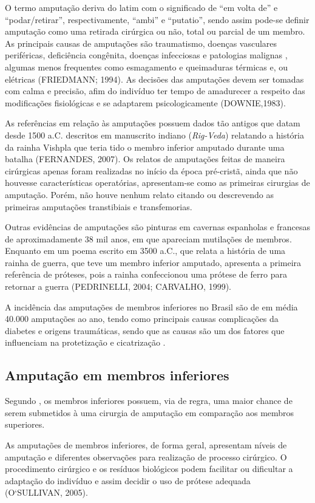 O termo amputação deriva do latim com o significado de “em volta de” e “podar/retirar”, respectivamente, “ambi” e “putatio”, sendo assim pode-se definir amputação como uma retirada cirúrgica ou não, total ou parcial de um membro.  As principais causas de amputações são traumatismo, doenças vasculares periféricas, deficiência congênita, doenças infecciosas e patologias malignas \cite{Carvalho2003}, algumas menos frequentes como esmagamento e queimaduras térmicas e, ou elétricas (FRIEDMANN; 1994). As decisões das amputações devem ser tomadas com calma e precisão, afim do indivíduo ter tempo de amadurecer a respeito das modificações fisiológicas e se adaptarem psicologicamente (DOWNIE,1983).


As referências em relação às amputações possuem dados tão antigos que datam desde 1500 a.C. descritos em manuscrito indiano (\textit{Rig-Veda}) relatando a história da rainha Vishpla que teria tido o membro inferior amputado durante uma batalha (FERNANDES, 2007). Os relatos de amputações feitas de maneira cirúrgicas apenas foram realizadas no início da época pré-cristã, ainda que não houvesse características operatórias, apresentam-se como as primeiras cirurgias de amputação. Porém, não houve nenhum relato citando ou descrevendo as primeiras amputações transtibiais e transfemorias.


Outras evidências de amputações são pinturas em cavernas espanholas e francesas de aproximadamente 38 mil anos, em que apareciam mutilações de membros. Enquanto em um poema escrito em 3500 a.C., que relata a história de uma rainha de guerra, que teve um membro inferior amputado, apresenta a primeira referência de próteses, pois a rainha confeccionou uma prótese de ferro para retornar a guerra (PEDRINELLI, 2004; CARVALHO, 1999).

A incidência das amputações de membros inferiores no Brasil são de em média 40.000 amputações ao ano, tendo como principais causas complicações da diabetes e origens traumáticas, sendo que as causas são um dos fatores que influenciam na protetização e cicatrização \cite{Reis2012}.

\subsection{Amputação em membros inferiores}
    Segundo \cite{Barreto2013}, os membros inferiores possuem, via de regra, uma maior chance de serem submetidos à uma cirurgia de amputação em comparação aos membros superiores.

    As amputações de membros inferiores, de forma geral, apresentam níveis de amputação e diferentes observações para realização de processo cirúrgico.  O procedimento cirúrgico e os resíduos biológicos podem facilitar ou dificultar a adaptação do indivíduo e assim decidir o uso de prótese adequada (O‘SULLIVAN, 2005).

